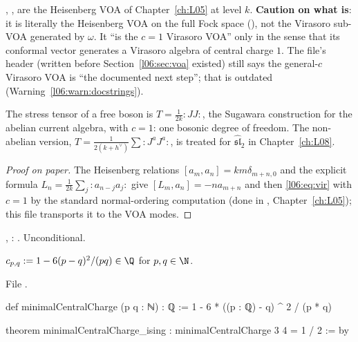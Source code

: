 \begin{dictionary}
, ,  are the Heisenberg VOA of Chapter~\ref{ch:L05} at level
$k$. \textbf{Caution on what  is}: it is literally the Heisenberg VOA on the full Fock
space (\allowbreak{}\allowbreak{}), not the Virasoro sub-VOA generated by $\omega$. It ``is the
$c = 1$ Virasoro VOA'' only in the sense that its conformal vector generates a Virasoro algebra of central
charge $1$. The file's header (written before Section~\ref{l06:sec:voa} existed) still says the general-$c$
Virasoro VOA is ``the documented next step''; that is outdated (Warning~\ref{l06:warn:docstrings}).
\end{dictionary}

\begin{physics}
The stress tensor of a free boson is $T = \frac1{2k}{:}JJ{:}$, the Sugawara construction for the abelian
current algebra, with $c = 1$: one bosonic degree of freedom. The non-abelian version,
$T = \frac{1}{2(k+h^\vee)}\sum{:}J^aJ^a{:}$, is treated for $\widehat{\mathfrak{sl}}_2$ in Chapter~\ref{ch:L08}.
\end{physics}

\begin{proof}[Proof on paper]
The Heisenberg relations $[a_m,a_n] = km\delta_{m+n,0}$ and the explicit formula
$L_n = \frac1{2k}\sum_j{:}a_{n-j}a_j{:}$ give $[L_m,a_n] = -na_{m+n}$ and then \eqref{l06:eq:vir} with
$c = 1$ by the standard normal-ordering computation (done in ,
Chapter~\ref{ch:L05}); this file transports it to the VOA modes.
\end{proof}

\begin{status}
\allowbreak{}\allowbreak{}\allowbreak{}\allowbreak{}, : \lean{[propext, Classical.}\allowbreak{}\allowbreak\lean{sound]}. Unconditional.
\end{status}

\begin{definition}\label{l06:def:cpq}
$c_{p,q} := 1-6(p-q)^2/(pq)\in\Q$ for $p,q\in\N$.
\end{definition}

File .
\begin{leancode}
def minimalCentralCharge (p q : ℕ) : ℚ := 1 - 6 * ((p : ℚ) - q) ^ 2 / (p * q)

theorem minimalCentralCharge_ising : minimalCentralCharge 3 4 = 1 / 2 := by
\end{leancode}

